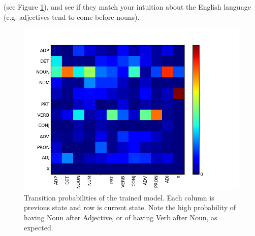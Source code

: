  (see
Figure \ref{fig:transProbs}), and see if they match your intuition
about the English language (e.g. adjectives tend to come before nouns).

\begin{figure}
\centering
\includegraphics[scale=.5]{figs/sequences/transition_probs}
\caption{\label{fig:transProbs} Transition probabilities of the
trained model. Each column is previous state and row is current
state. Note the high probability of having Noun after Adjective, or of having Verb after Noun, as expected.}
\end{figure}

